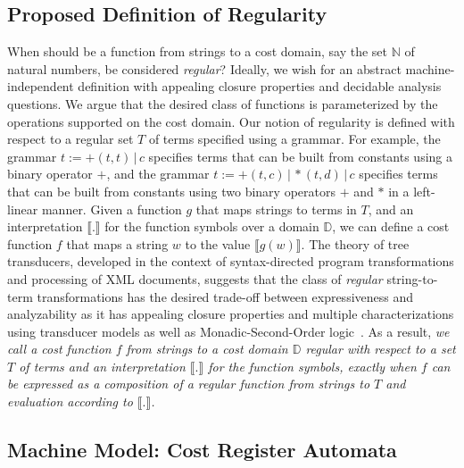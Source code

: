 \documentclass[11pt]{article}
\newcommand{\mypar}[1]{\subsection{#1}}
\newcommand{\domain}{\ensuremath{\mathbb{D}}}
\newcommand{\Nat}{\ensuremath{\mathbb{N}}}
\newcommand{\sep}{\ensuremath{\,|\,}}
\newcommand{\interp}[1]{\ensuremath{\llbracket #1\rrbracket}}
\begin{document}
\mypar{Proposed Definition of Regularity}

When should be a function from strings to a cost domain, say the set
$\Nat$ of natural numbers, be considered {\em regular\/}? Ideally, we
wish for an abstract machine-independent definition with appealing
closure properties and decidable analysis questions.  We argue that
the desired class of functions is parameterized by the operations
supported on the cost domain.  Our notion of regularity is defined
with respect to a regular set $T$ of terms specified using a grammar.
For example, the grammar $t := +(t,t)\sep c$ specifies terms that can
be built from constants using a binary operator $+$, and the grammar
$t := +(t,c) \sep *(t,d)\sep c$ specifies terms that can be built from
constants using two binary operators $+$ and $*$ in a left-linear
manner.  Given a function $g$ that maps strings to terms in $T$, and
an interpretation $\interp{.}$ for the function symbols over a domain
$\domain$, we can define a cost function $f$ that maps a string $w$ to
the value $\interp{g(w)}$.  The theory of tree transducers, developed
in the context of syntax-directed program transformations and
processing of XML documents,  suggests that the class of {\em
regular\/} string-to-term transformations has the desired trade-off
between expressiveness and analyzability as it has appealing closure
properties and multiple characterizations using transducer models as
well as Monadic-Second-Order
logic~\cite{engelfriet_macro2_1999,courcelle_graph_2002,alur_stt_2011,Ho11}.
As a result, {\em we call a cost function $f$ from strings to a cost
domain $\domain$ regular with respect to a set $T$ of terms and an
interpretation $\interp{.}$ for the function symbols, exactly when $f$
can be expressed as a composition of a regular function from strings
to $T$ and evaluation according to $\interp{.}$.}

\mypar{Machine Model: Cost Register Automata}
\end{document}
